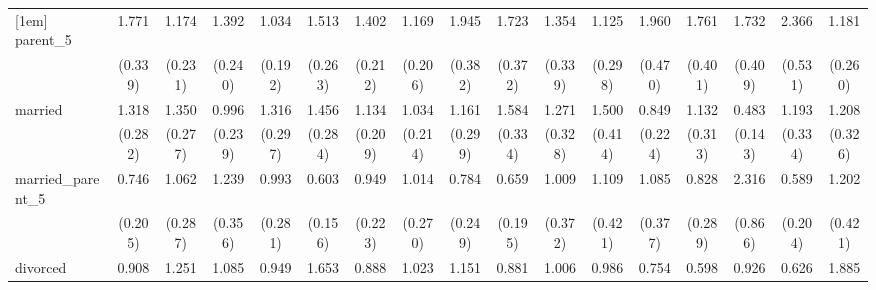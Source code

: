 {\begin{tabular}{l*{16}{c}}
[1em]
parent\_5            &       1.771\sym{**} &       1.174         &       1.392         &       1.034         &       1.513\sym{*}  &       1.402\sym{*}  &       1.169         &       1.945\sym{***}&       1.723\sym{*}  &       1.354         &       1.125         &       1.960\sym{**} &       1.761\sym{*}  &       1.732\sym{*}  &       2.366\sym{***}&       1.181         \\
                    &     (0.339)         &     (0.231)         &     (0.240)         &     (0.192)         &     (0.263)         &     (0.212)         &     (0.206)         &     (0.382)         &     (0.372)         &     (0.339)         &     (0.298)         &     (0.470)         &     (0.401)         &     (0.409)         &     (0.531)         &     (0.260)         \\
[1em]
married             &       1.318         &       1.350         &       0.996         &       1.316         &       1.456         &       1.134         &       1.034         &       1.161         &       1.584\sym{*}  &       1.271         &       1.500         &       0.849         &       1.132         &       0.483\sym{*}  &       1.193         &       1.208         \\
                    &     (0.282)         &     (0.277)         &     (0.239)         &     (0.297)         &     (0.284)         &     (0.209)         &     (0.214)         &     (0.299)         &     (0.334)         &     (0.328)         &     (0.414)         &     (0.224)         &     (0.313)         &     (0.143)         &     (0.334)         &     (0.326)         \\
[1em]
married\_parent\_5    &       0.746         &       1.062         &       1.239         &       0.993         &       0.603         &       0.949         &       1.014         &       0.784         &       0.659         &       1.009         &       1.109         &       1.085         &       0.828         &       2.316\sym{*}  &       0.589         &       1.202         \\
                    &     (0.205)         &     (0.287)         &     (0.356)         &     (0.281)         &     (0.156)         &     (0.223)         &     (0.270)         &     (0.249)         &     (0.195)         &     (0.372)         &     (0.421)         &     (0.377)         &     (0.289)         &     (0.866)         &     (0.204)         &     (0.421)         \\
[1em]
divorced            &       0.908         &       1.251         &       1.085         &       0.949         &       1.653         &       0.888         &       1.023         &       1.151         &       0.881         &       1.006         &       0.986         &       0.754         &       0.598         &       0.926         &       0.626         &       1.885\sym{*}  \\

\end{tabular}}

